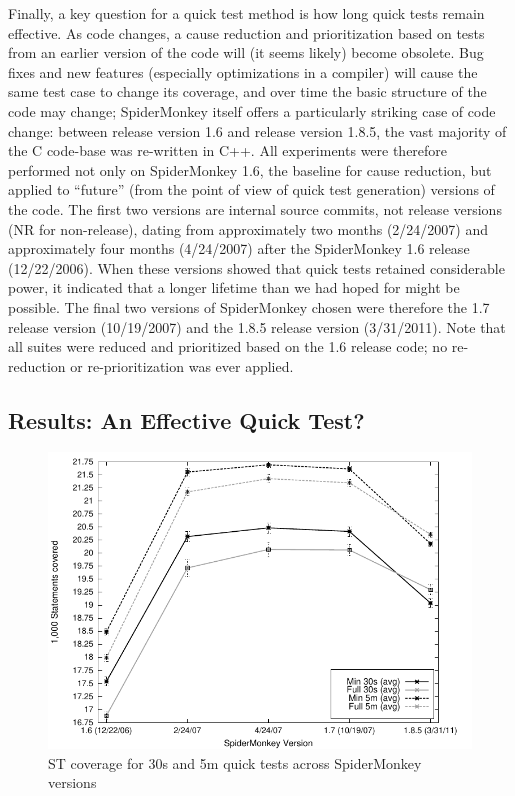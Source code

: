 Finally, a key question for a quick test method is how long quick
tests remain effective.  As code changes, a cause reduction and
prioritization based on tests from an earlier version of the code will
(it seems likely) become obsolete.  Bug fixes and new features
(especially optimizations in a compiler) will cause the same test case
to change its coverage, and over time the basic structure of the code
may change; SpiderMonkey itself offers a particularly striking case of
code change: between release version 1.6 and release version 1.8.5,
the vast majority of the C code-base was re-written in C++.  All
experiments were therefore performed not only on SpiderMonkey 1.6, the
baseline for cause reduction, but applied to ``future'' (from the
point of view of quick test generation) versions of the code.  The
first two versions are internal source commits, not release versions
(NR for non-release), dating from approximately two months (2/24/2007)
and approximately four months (4/24/2007) after the SpiderMonkey 1.6
release (12/22/2006).  When these versions showed that quick tests
retained considerable power, it indicated that a longer lifetime than
we had hoped for might be possible.  The final two versions of
SpiderMonkey chosen were therefore the 1.7 release version
(10/19/2007) and the 1.8.5 release version (3/31/2011).  Note that all
suites were reduced and prioritized based on the 1.6 release code; no
re-reduction or re-prioritization was ever applied.

\subsection{Results:  An Effective Quick Test?}

\begin{figure}
  \centering
  \includegraphics[width=\columnwidth]{scov}
  \caption{ST coverage for 30s and 5m quick tests across SpiderMonkey versions}
  \label{fig:scov}
\vspace{-0.2in}
\end{figure}


